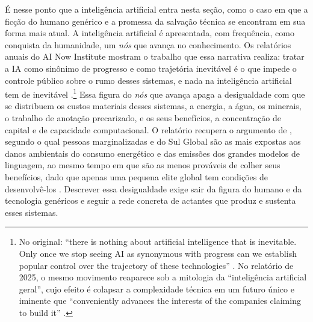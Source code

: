É nesse ponto que a inteligência artificial entra nesta seção, como o caso em que a ficção do humano genérico e a promessa da salvação técnica se encontram em sua forma mais atual. A inteligência artificial é apresentada, com frequência, como conquista da humanidade, um \textit{nós} que avança no conhecimento. Os relatórios anuais do AI Now Institute mostram o trabalho que essa narrativa realiza: tratar a IA como sinônimo de progresso e como trajetória inevitável é o que impede o controle público sobre o rumo desses sistemas, e nada na inteligência artificial tem de inevitável \parencite[p.~5]{Kak2023Confronting}.\footnote{No original: \enquote{there is nothing about artificial intelligence that is inevitable. Only once we stop seeing AI as synonymous with progress can we establish popular control over the trajectory of these technologies} \parencite[p.~5, tradução minha]{Kak2023Confronting}. No relatório de 2025, o mesmo movimento reaparece sob a mitologia da \enquote{inteligência artificial geral}, cujo efeito é colapsar a complexidade técnica em um futuro único e iminente que \enquote{conveniently advances the interests of the companies claiming to build it} \parencite[p.~10, tradução minha]{Brennan2025ArtificialPower}.} Essa figura do \textit{nós} que avança apaga a desigualdade com que se distribuem os custos materiais desses sistemas, a energia, a água, os minerais, o trabalho de anotação precarizado, e os seus benefícios, a concentração de capital e de capacidade computacional. O relatório recupera o argumento de \textcite{Bender2021Stochastic}, segundo o qual pessoas marginalizadas e do Sul Global são as mais expostas aos danos ambientais do consumo energético e das emissões dos grandes modelos de linguagem, ao mesmo tempo em que são as menos prováveis de colher seus benefícios, dado que apenas uma pequena elite global tem condições de desenvolvê-los \parencite[p.~33]{Kak2023Confronting}. Descrever essa desigualdade exige sair da figura do humano e da tecnologia genéricos e seguir a rede concreta de actantes que produz e sustenta esses sistemas.

